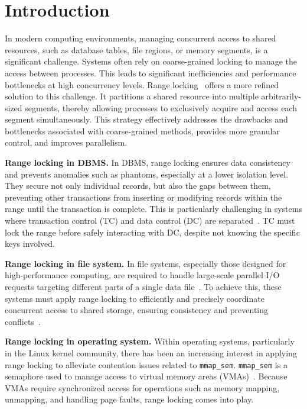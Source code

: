 \chapter{Introduction}\label{chapter:introduction}

In modern computing environments, managing concurrent access to shared resources, such as database tables, file regions, or memory segments, is a significant challenge.
Systems often rely on coarse-grained locking to manage the access between processes. 
This leads to significant inefficiencies and performance bottlenecks at high concurrency levels. 
Range locking~\parencite{gao2023citron, kogan2020scalable, song2013parallelizing} offers a more refined solution to this challenge. 
It partitions a shared resource into multiple arbitrarily-sized segments, thereby allowing processes to exclusively acquire and access each segment simultaneously.
This strategy effectively addresses the drawbacks and bottlenecks associated with coarse-grained methods, provides more granular control, and improves parallelism.

\textbf{Range locking in DBMS.} In DBMS, range locking ensures data consistency and prevents anomalies such as phantoms, especially at a lower isolation level. 
They secure not only individual records, but also the gaps between them, preventing other transactions from inserting or modifying records within the range until the transaction is complete. 
This is particularly challenging in systems where transaction control (TC) and data control (DC) are separated~\parencite{lomet2009locking}. 
TC must lock the range before safely interacting with DC, despite not knowing the specific keys involved.

\textbf{Range locking in file system.} In file systems, especially those designed for high-performance computing, are required to handle large-scale parallel I/O requests targeting different parts of a single data file~\parencite{congiu2016improving, kang2021optimizing}. 
To achieve this, these systems must apply range locking to efficiently and precisely coordinate concurrent access to shared storage, ensuring consistency and preventing conflicts~\parencite{gao2023citron, kim2019pnova, kogan2020scalable}.

\textbf{Range locking in operating system.} Within operating systems, particularly in the Linux kernel community, there has been an increasing interest in applying range locking to alleviate contention issues related to \texttt{mmap\_sem}. 
\texttt{mmap\_sem} is a semaphore used to manage access to virtual memory areas (VMAs)~\parencite{readerWriterLocks2017, mapleTree2021, mmapLock2022}. 
Because VMAs require synchronized access for operations such as memory mapping, unmapping, and handling page faults, range locking comes into play.

